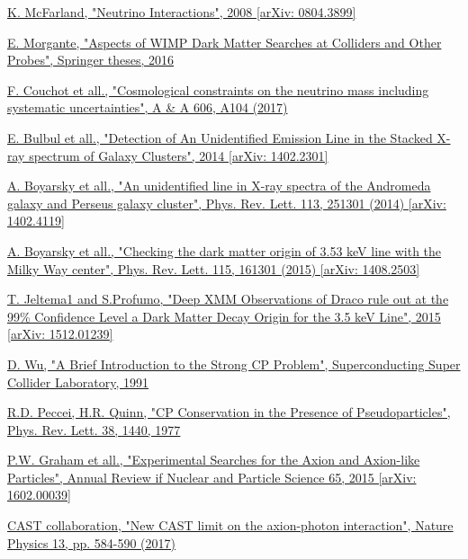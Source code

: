 \documentclass[a4paper, 10pt, openright]{report}
\begin{document}
\begin{thebibliography}{1}
\href{https://arxiv.org/pdf/0804.3899.pdf}{K. McFarland,
"Neutrino Interactions",
2008 [arXiv: 0804.3899]
}

\href{http://inspirehep.net/record/1510610}{E. Morgante,
"Aspects of WIMP Dark Matter Searches at Colliders and Other Probes",
Springer theses, 2016
}

\href{https://www.aanda.org/articles/aa/pdf/2017/10/aa30927-17.pdf}{F. Couchot et all.,
"Cosmological constraints on the neutrino mass including systematic uncertainties",
A \& A 606, A104 (2017)
}

\href{https://arxiv.org/abs/1402.2301}{E. Bulbul et all.,
"Detection of An Unidentified Emission Line in the Stacked X-ray spectrum of Galaxy Clusters",
2014 [arXiv: 1402.2301]
}

\href{https://arxiv.org/abs/1402.4119}{A. Boyarsky et all.,
"An unidentified line in X-ray spectra of the Andromeda galaxy and Perseus galaxy cluster",
Phys. Rev. Lett. 113, 251301 (2014) [arXiv: 1402.4119]
}

\href{https://arxiv.org/abs/1408.2503}{A. Boyarsky et all.,
"Checking the dark matter origin of 3.53 keV line with the Milky Way center",
Phys. Rev. Lett. 115, 161301 (2015) [arXiv: 1408.2503]
}

\href{https://arxiv.org/abs/1512.01239}{T. Jeltema1 and S.Profumo,
"Deep XMM Observations of Draco rule out at the 99\% Confidence Level a Dark Matter Decay Origin for the 3.5 keV Line",
2015 [arXiv: 1512.01239]
}

\href{https://www.osti.gov/servlets/purl/6260191}{D. Wu,
"A Brief Introduction to the Strong CP Problem",
Superconducting Super Collider Laboratory, 1991
}

\href{https://journals.aps.org/prl/abstract/10.1103/PhysRevLett.38.1440}{R.D. Peccei, H.R. Quinn,
"CP Conservation in the Presence of Pseudoparticles",
Phys. Rev. Lett. 38, 1440, 1977
}

\href{https://arxiv.org/abs/1602.00039}{P.W. Graham et all.,
"Experimental Searches for the Axion and Axion-like Particles",
Annual Review if Nuclear and Particle Science 65, 2015 [arXiv: 1602.00039]
}

\href{https://www.nature.com/articles/nphys4109}{CAST collaboration,
"New CAST limit on the axion-photon interaction",
Nature Physics 13, pp. 584-590 (2017)
}


\end{thebibliography}
\end{document}
